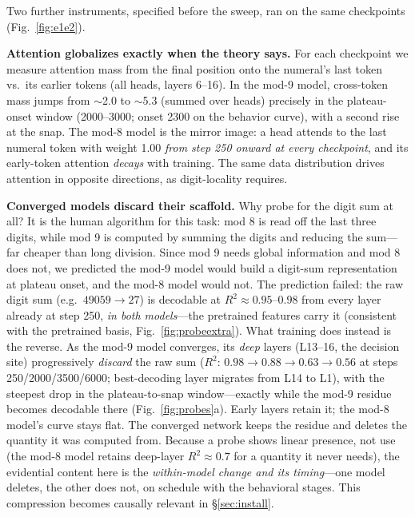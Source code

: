 \documentclass{article} %
\begin{document}
Two further instruments, specified before the sweep, ran on the same checkpoints (Fig.~\ref{fig:e1e2}).

\textbf{Attention globalizes exactly when the theory says.} For each checkpoint we measure attention mass from the final position onto the numeral's last token vs.\ its earlier tokens (all heads, layers 6--16). In the mod-9 model, cross-token mass jumps from $\sim$2.0 to $\sim$5.3 (summed over heads) precisely in the plateau-onset window (2000--3000; onset 2300 on the behavior curve), with a second rise at the snap. The mod-8 model is the mirror image: a head attends to the last numeral token with weight 1.00 \emph{from step 250 onward at every checkpoint}, and its early-token attention \emph{decays} with training. The same data distribution drives attention in opposite directions, as digit-locality requires.

\textbf{Converged models discard their scaffold.} Why probe for the digit sum at all? It is the human algorithm for this task: mod 8 is read off the last three digits, while mod 9 is computed by summing the digits and reducing the sum---far cheaper than long division. Since mod 9 needs global information and mod 8 does not, we predicted the mod-9 model would build a digit-sum representation at plateau onset, and the mod-8 model would not. The prediction failed: the raw digit sum (e.g.\ $49059 \to 27$) is decodable at $R^2 \approx 0.95$--$0.98$ from every layer already at step 250, \emph{in both models}---the pretrained features carry it (consistent with the pretrained basis, Fig.~\ref{fig:probeextra}). What training does instead is the reverse. As the mod-9 model converges, its \emph{deep} layers (L13--16, the decision site) progressively \emph{discard} the raw sum ($R^2$: $0.98 \to 0.88 \to 0.63 \to 0.56$ at steps 250/2000/3500/6000; best-decoding layer migrates from L14 to L1), with the steepest drop in the plateau-to-snap window---exactly while the mod-9 residue becomes decodable there (Fig.~\ref{fig:probes}a). Early layers retain it; the mod-8 model's curve stays flat. The converged network keeps the residue and deletes the quantity it was computed from. Because a probe shows linear presence, not use (the mod-8 model retains deep-layer $R^2 \approx 0.7$ for a quantity it never needs), the evidential content here is the \emph{within-model change and its timing}---one model deletes, the other does not, on schedule with the behavioral stages. This compression becomes causally relevant in \S\ref{sec:install}.
\end{document}
